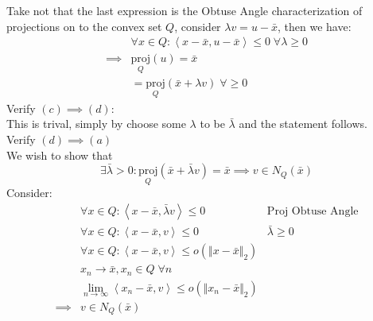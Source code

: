 \documentclass[]{article}
\begin{document}
        Take not that the last expression is the Obtuse Angle characterization of projections on to the convex set $Q$, consider $\lambda v = u - \bar{x}$, then we have: 
        \begin{align*}\tag{2.37.3}\label{eqn:2.37.3}
            & \forall x \in Q: \left\langle x - \bar{x}, u - \bar{x} \right\rangle \le 0 \;\forall \lambda \ge 0 
            \\
            \implies & \underset{Q}{\text{proj}}(u) = \bar{x}
            \\
            &= \underset{Q}{\text{proj}}(\bar{x} + \lambda v)\;\forall \ge 0 
        \end{align*}
    Verify $(c)\implies (d)$: 
    \\
    This is trival, simply by choose some $\lambda$ to be $\bar{\lambda}$ and the statement follows. 
    \\
    Verify $(d)\implies (a)$\\
    We wish to show that 
    $$
        \exists \bar{\lambda} > 0 : \underset{Q}{\text{proj}}(\bar{x} + \bar{\lambda}v) = \bar{x} \implies v \in N_Q(\bar{x})
    $$
    Consider: 
    \begin{align*}\tag{2.37.4}\label{eqn:2.37.4}
        & \forall x \in Q: \left\langle x - \bar{x}, \bar{\lambda}v \right\rangle \le 0 & \text{Proj Obtuse Angle}
        \\
        & \forall x \in Q: \left\langle x - \bar{x}, v \right\rangle \le 0 & \bar{\lambda} \ge 0 
        \\
        & \forall x \in Q: \left\langle x - \bar{x}, v \right\rangle \le o(\Vert x - \bar{x}\Vert_2) & 
        \\
        & x_n \rightarrow \bar{x}, x_n \in Q \;\forall n & 
        \\
        & \lim_{n\rightarrow \infty} \left\langle x_n - \bar{x}, v \right\rangle \le o(\Vert x_n - \bar{x}\Vert_2)& 
        \\
        \implies &v \in N_Q(\bar{x})& 
    \end{align*}
    
    
\end{document}
